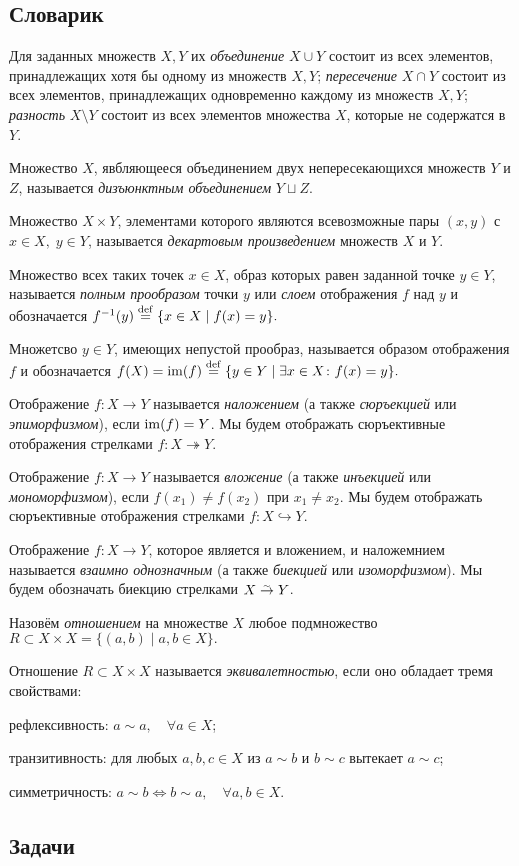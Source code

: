 \documentclass[10pt]{article}
\begin{document}
\subsection*{Словарик}
\begin{bullets}
    \item Для заданных множеств $X, Y$ их \emph{объединение} $X \cup Y$ состоит из всех элементов, принадлежащих хотя бы одному из множеств $X, Y$; \emph{пересечение} $X \cap Y$ состоит из всех элементов, принадлежащих одновременно каждому из множеств $X, Y$; \emph{разность} $X \setminus Y$ состоит из всех элементов множества $X$, которые не содержатся в $Y$.
    \item Множество $X$, явбляющееся объединением двух непересекающихся множеств $Y$ и $Z$, называется \emph{дизъюнктным объединением} $Y \sqcup Z$.
    \item Множество $X \times Y$, элементами которого являются всевозможные пары $(x, y)$ с $x \in X,\; y \in Y$, называется \emph{декартовым произведением} множеств $X$ и $Y$.
    \item Множество всех таких точек $x \in X$, образ которых равен заданной точке $y \in Y$, называется \emph{полным прообразом} точки $y$ или \emph{слоем} отображения $f$ над $y$ и обозначается \(f^{-1}(y) \overset{\footnotesize{\mathrm{def}}}{=} \{x \in X \mid f(x) = y \} .\)
    \item Множетсво $y \in Y$, имеющих непустой прообраз, называется образом отображения $f$ и обозначается \( f(X) = \operatorname{im} (f) \overset{\footnotesize{\mathrm{def}}}{=} \{y \in Y \mid \exists x \in X \colon f(x) = y \}. \)
    \item Отображение $f \colon X \to Y$ называется \emph{наложением} (а также \emph{сюръекцией} или \emph{эпиморфизмом}), если $\operatorname{im}(f) = Y$. Мы будем отображать сюръективные отображения стрелками $f \colon X \twoheadrightarrow Y$. 
    \item Отображение $f \colon X \to Y$ называется \emph{вложение} (а также \emph{инъекцией} или \emph{мономорфизмом}), если $f(x_1) \neq f(x_2)$ при $x_1 \neq x_2$. Мы будем отображать сюръективные отображения стрелками $f \colon X \hookrightarrow Y$. 
    \item Отображение $f \colon X \to Y$, которое является и вложением, и наложемнием называется \emph{взаимно однозначным} (а также \emph{биекцией} или \emph{изоморфизмом}). Мы будем обозначать биекцию стрелками $X \overset{_\sim}{\to} Y$.
    \item Назовём \emph{отношением} на множестве $X$ любое подмножество \(R \subset X\times X = \{(a, b)\mid a, b \in X\}.\)
    \item Отношение $R \subset X \times X$ называется \emph{эквивалетностью}, если оно обладает тремя свойствами: 
    \begin{enumerate*}[(i)]
    \item рефлексивность: $a \sim a, \quad \forall a \in X$;
    \item транзитивность: для любых $a, b, c \in X$ из $a \sim b$ и $b \sim c $ вытекает $a \sim c$;
    \item симметричность: $a \sim b \iff b \sim a, \quad \forall a, b \in X$. \end{enumerate*}

\end{bullets}

\subsection*{Задачи}

\end{document}
